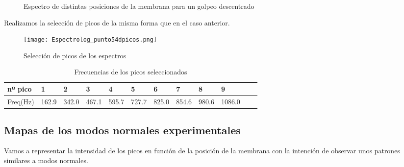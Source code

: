 \documentclass[journal, a4paper,onecolumn]{IEEEtran}
\begin{document}
    \begin{figure}[H]
        \centering
    \quad
    \quad
     \caption{Espectro de distintas posiciones de la membrana para un golpeo descentrado}
    \end{figure}
    
Realizamos la selección de picos de la misma forma que en el caso anterior.

\begin{figure}[H]
    \centering
    \texttt{[image: Espectrolog\_punto54dpicos.png]}
    \caption{Selección de picos de los espectros }
    \label{seleccionde picos}
\end{figure}
    
    
    \begin{table}[H]
\centering
\begin{tabular}{l|l|l|l|l|l|l|l|l|l|l|l|}
nº pico & 1 & 2 & 3 & 4 & 5 & 6 & 7 & 8 & 9  \\ \hline
Freq(Hz)   & 162.9   & 342.0   & 467.1   & 595.7   & 727.7   & 825.0   & 854.6   & 980.6    & 1086.0     
\end{tabular}
\caption{Frecuencias de los picos seleccionados}
\end{table}
    



\subsection{Mapas de los modos normales experimentales}
Vamos a representar la intensidad de los picos en función de la posición de la membrana con la intención de observar unos patrones similares a modos normales.%
\end{document}
